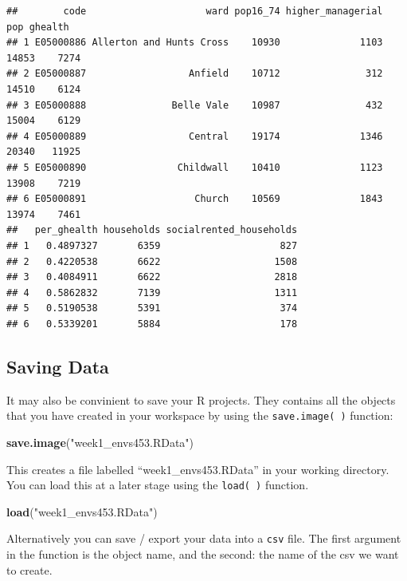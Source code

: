 \documentclass[]{book}
\newenvironment{Shaded}{\begin{snugshade}}{\end{snugshade}}
\newcommand{\KeywordTok}[1]{\textcolor[rgb]{0.13,0.29,0.53}{\textbf{#1}}}
\newcommand{\StringTok}[1]{\textcolor[rgb]{0.31,0.60,0.02}{#1}}
\newcommand{\NormalTok}[1]{#1}
\begin{document}
\begin{verbatim}
##        code                     ward pop16_74 higher_managerial   pop ghealth
## 1 E05000886 Allerton and Hunts Cross    10930              1103 14853    7274
## 2 E05000887                  Anfield    10712               312 14510    6124
## 3 E05000888               Belle Vale    10987               432 15004    6129
## 4 E05000889                  Central    19174              1346 20340   11925
## 5 E05000890                Childwall    10410              1123 13908    7219
## 6 E05000891                   Church    10569              1843 13974    7461
##   per_ghealth households socialrented_households
## 1   0.4897327       6359                     827
## 2   0.4220538       6622                    1508
## 3   0.4084911       6622                    2818
## 4   0.5862832       7139                    1311
## 5   0.5190538       5391                     374
## 6   0.5339201       5884                     178
\end{verbatim}

\subsection{Saving Data}\label{saving-data}

It may also be convinient to save your R projects. They contains all the
objects that you have created in your workspace by using the
\texttt{save.image(\ )} function:

\begin{Shaded}
\begin{Highlighting}[]
\KeywordTok{save.image}\NormalTok{(}\StringTok{"week1_envs453.RData"}\NormalTok{)}
\end{Highlighting}
\end{Shaded}

This creates a file labelled ``week1\_envs453.RData'' in your working
directory. You can load this at a later stage using the
\texttt{load(\ )} function.

\begin{Shaded}
\begin{Highlighting}[]
\KeywordTok{load}\NormalTok{(}\StringTok{"week1_envs453.RData"}\NormalTok{)}
\end{Highlighting}
\end{Shaded}

Alternatively you can save / export your data into a \texttt{csv} file.
The first argument in the function is the object name, and the second:
the name of the csv we want to create.
\end{document}
